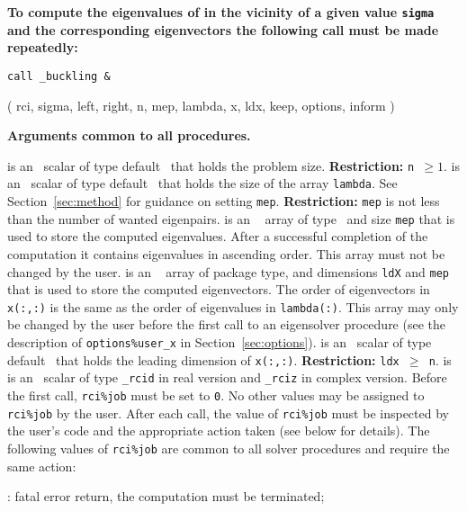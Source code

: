 \medskip
\noindent
{\bf
To compute the eigenvalues of  %
in the vicinity of 
a given value {\tt sigma}
and the corresponding eigenvectors %
the following call must be made repeatedly:
}

\medskip
{\tt call
\solver\_buckling \&

\hspace{8mm} 
( rci, sigma, left, right, n, mep, lambda, x, ldx, keep, options, inform )
}

\medskip
\noindent
{\bf Arguments common to all procedures.}

\begin{description}
%
 is an \intentin\ scalar of type default \Integer\ 
that holds the problem size.
{\bf Restriction:} {\tt n $\ge 1$}.
%
 is an \intentin\ scalar of type default \Integer\ 
that holds the size of the array {\tt lambda}.
See Section~\ref{sec:method} for guidance on
setting {\tt mep}.
{\bf Restriction:} 
{\tt mep} is not less than the number of wanted eigenpairs.
%
 is an \intentinout\ %
array of type \REALDP\
and size {\tt mep} that is
used to store the computed eigenvalues.
After a successful completion of the computation
it contains eigenvalues in ascending order.
This array must not be changed by the user.
%
\itt{x(:,:)} is an \intentinout\ %
array of package type,
and dimensions {\tt ldX} and {\tt mep} that is
used to store the computed eigenvectors.
The order of eigenvectors in {\tt x(:,:)}
is the same as the order of eigenvalues in {\tt lambda(:)}.
This array may only be changed by the user
before the first call to an eigensolver procedure
(see the description of {\tt options\%user\_x} in Section~\ref{sec:options}).
%
\itt{ldx} is an \intentin\ scalar of type default \Integer\ 
that holds the leading dimension of {\tt x(:,:)}.
{\bf Restriction:} {\tt ldx $\ge$ n}.
%
\itt{rci} is is an \intentinout\ scalar  of type
{\tt \solver\_rcid} in real version and
{\tt \solver\_rciz} in complex version.
Before the first call, {\tt rci\%job} must be set to {\tt 0}.
No other values may be assigned to {\tt rci\%job} by the user.
After each call,
the value of {\tt rci\%job} must be inspected by the user's code
and the appropriate action taken (see below for details).
The following values of {\tt rci\%job}
are common to all solver procedures 
and require the same action: 
%
\begin{description}
%
: fatal error return, the computation must be terminated;

\end{description}
\end{description}
